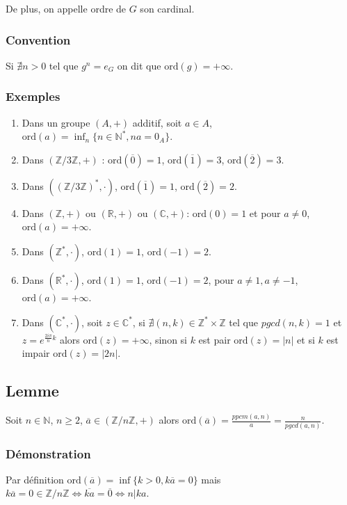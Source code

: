 \documentclass[a4paper,10pt]{book} %
\newcommand{\R}{\mathbb{R}}
\newcommand{\N}{\mathbb{N}}
\newcommand{\Z}{\mathbb{Z}}
\newcommand{\C}{\mathbb{C}}
\newcommand{\abs}[1]{\left|#1\right|}
\newcommand{\ord}{\mathrm{ord}}
\begin{document}
De plus, on appelle ordre de $G$ son cardinal.

\subsubsection{Convention}
Si $\nexists n>0$ tel que $g^n=e_G$ on dit que $\ord(g)=+\infty$.

\subsubsection{Exemples}
\begin{enumerate}
\item Dans un groupe $(A,+)$ additif, soit $a\in A$, $\ord(a)= \inf_n\{ n\in \N^* , na = 0_A\}$.\smallskip

\item Dans $(\Z/3\Z , +)$ : $\ord(\overline{0})=1$, $\ord(\overline{1})=3$, $\ord(\overline{2})=3$.\smallskip

\item Dans $((\Z/3\Z)^*,\cdot)$, $\ord(\overline{1}) = 1$, $\ord(\overline{2}) = 2$.\smallskip

\item Dans $(\Z , +)$ ou $(\R , +)$ ou $(\C, +)$: $\ord(0) = 1$ et pour $a\neq 0$, $\ord(a) = +\infty$.\smallskip

\item Dans $(\Z^*,\cdot)$, $\ord(1) = 1$, $\ord(-1)= 2$.\smallskip

\item Dans $(\R^*,\cdot)$,  $\ord(1)=1$, $\ord(-1)=2$, pour $a\neq 1,a\neq -1$, $\ord(a) = +\infty$.\smallskip

\item Dans $(\C^*,\cdot)$, soit $z\in \C^*$, si $\nexists (n,k)\in \Z^*\times \Z$ tel que $pgcd(n,k)=1$ et $z=e^{\frac{2i\pi}{n}k}$ alors $\ord(z)= +\infty$, sinon si $k$ est pair $\ord(z)=\abs{n}$ et si $k$ est impair $\ord(z)=\abs{2n}$.
\end{enumerate}

\subsection{Lemme}\label{lemmeJusteAvantLagrange} %
Soit $n \in \N$, $n\geq 2$, $\overline{a}\in (\Z/n\Z,+)$ alors $\ord(\overline{a})=\frac{ppcm(a,n)}{a}=\frac{n}{pgcd(a,n)}$.

\subsubsection{Démonstration}
Par définition $\ord(\overline{a})=\inf\{k>0, k\overline{a}=0\}$ mais 
$k\overline{a}=0 \in \Z/n\Z \Leftrightarrow \overline{ka}=\overline{0} \Leftrightarrow n|ka$.\\
\end{document}
